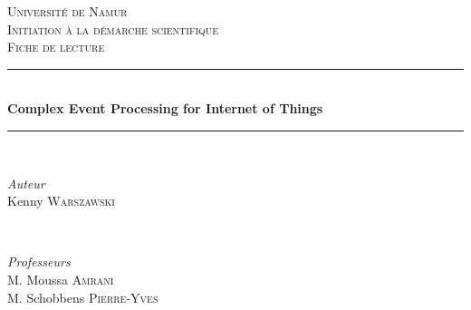 \documentclass[11pt]{article}
\begin{document}

\begin{titlepage} %
	\newcommand{\HRule}{\rule{\linewidth}{0.5mm}} %
	
	\center %
	
	
	\textsc{\LARGE Université de Namur}\\[1.5cm] %
	
	\textsc{\Large Initiation à la démarche scientifique}\\[0.5cm] %
	
	\textsc{\large Fiche de lecture\\[0.5cm]} %
	
	
	\HRule\\[0.4cm]
	
	{\huge\bfseries Complex Event Processing for Internet of Things }\\[0.4cm] %
	
	\HRule\\[1.5cm]
	
	
	\begin{minipage}{0.4\textwidth}
		\begin{flushleft}
			\textit{Auteur}\\
			
			\large Kenny \textsc{Warszawski}
		\end{flushleft}

	\end{minipage}
	~
	\begin{minipage}{0.5\textwidth}
		\begin{flushright}
			\large
			\textit{Professeurs}\\
			M. Moussa \textsc{Amrani}\\
			M. Schobbens \textsc{Pierre-Yves}
		\end{flushright}
	\end{minipage}
	

\end{titlepage}
\end{document}

